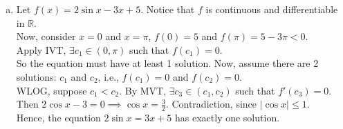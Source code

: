 \documentclass[11pt]{article}
\begin{document}
\begin{enumerate}[(a)]
    \item Let $f(x)=2\sin x -3x+5$. Notice that $f$ is continuous and differentiable in $\mathbb{R}$. \\
    Now, consider $x=0$ and $x=\pi$, $f(0)=5$ and $f(\pi)=5-3\pi < 0.$\\
    Apply IVT, $\exists c_1 \in (0,\pi)$ such that $f(c_1)=0.$\\
    So the equation must have at least 1 solution. Now, assume there are 2 solutions: $c_1$ and $c_2$, i.e., $f(c_1)=0$ and $f(c_2)=0.$ \\
    WLOG, suppose $c_1 <c_2$. By MVT, $\exists c_3 \in (c_1,c_2)$ such that $f'(c_3)=0.$ Then $2\cos x -3 = 0 \implies \cos x = \frac{3}{2}.$ Contradiction, since $
    \lvert \cos x \rvert \leq 1.$\\
    Hence, the equation $\displaystyle 2\sin x = 3x+5$ has exactly one solution. 
\end{enumerate}

\newpage
\end{document}
